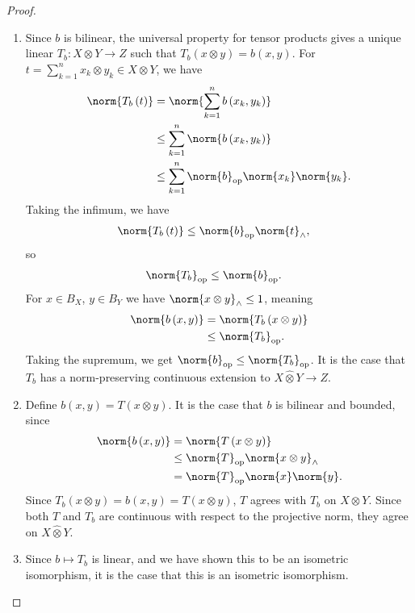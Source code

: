 \documentclass[10pt]{mypackage}
\begin{document}
\begin{proof}\hfill
  \begin{enumerate}[(1)]
    \item Since $b$ is bilinear, the universal property for tensor products gives a unique linear $T_{b}:X\otimes Y\rightarrow Z$ such that $T_{b}\left(x\otimes y\right) = b\left(x,y\right)$. For $t = \sum_{k=1}^{n}x_k\otimes y_k\in X\otimes Y$, we have
      \begin{align*}
        \norm{T_b\left(t\right)} &= \norm{\sum_{k=1}^{n}b\left(x_k,y_k\right)}\\
                                 &\leq \sum_{k=1}^{n}\norm{b\left(x_k,y_k\right)}\\
                                 &\leq \sum_{k=1}^{n}\norm{b}_{\text{op}}\norm{x_k}\norm{y_k}.
      \end{align*}
      Taking the infimum, we have
      \begin{align*}
        \norm{T_b\left(t\right)} &\leq \norm{b}_{\text{op}}\norm{t}_{\wedge},
      \end{align*}
      so
      \begin{align*}
        \norm{T_b}_{\text{op}} &\leq \norm{b}_{\text{op}}.
      \end{align*}
      For $x\in B_X$, $y\in B_Y$ we have $\norm{x\otimes y}_{\wedge}\leq 1$, meaning
      \begin{align*}
        \norm{b\left(x,y\right)} &= \norm{T_b\left(x\otimes y\right)}\\
                                 &\leq \norm{T_b}_{\text{op}}.
      \end{align*}
      Taking the supremum, we get $\norm{b}_{\text{op}}\leq \norm{T_b}_{\text{op}}$. It is the case that $T_{b}$ has a norm-preserving continuous extension to $X\hat\otimes Y\rightarrow Z$.
    \item Define $b(x,y) = T\left(x\otimes y\right)$. It is the case that $b$ is bilinear and bounded, since
      \begin{align*}
        \norm{b\left(x,y\right)} &= \norm{T\left(x\otimes y\right)}\\
                                 &\leq \norm{T}_{\text{op}}\norm{x\otimes y}_{\wedge}\\
                                 &= \norm{T}_{\text{op}}\norm{x}\norm{y}.
      \end{align*}
      Since $T_{b}\left(x\otimes y\right) = b\left(x,y\right) = T\left(x\otimes y\right)$, $T$ agrees with $T_{b}$ on $X\otimes Y$. Since both $T$ and $T_{b}$ are continuous with respect to the projective norm, they agree on $X\hat\otimes Y$.
    \item Since $b\mapsto T_{b}$ is linear, and we have shown this to be an isometric isomorphism, it is the case that this is an isometric isomorphism.
  \end{enumerate}
\end{proof}
\end{document}
